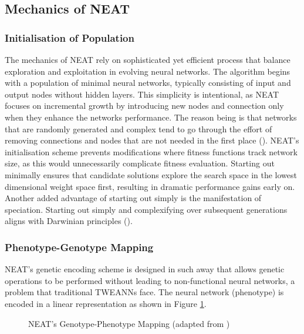 \subsection{Mechanics of NEAT}
\subsubsection{Initialisation of Population}
The mechanics of NEAT rely on sophisticated yet efficient process that balance exploration and exploitation in evolving neural networks. The algorithm begins with a population of minimal neural networks, typically consisting of input and output nodes without hidden layers. This simplicity is intentional, as NEAT focuses on incremental growth by introducing new nodes and connection only when they enhance the networks performance. The reason being is that networks that are randomly generated and complex tend to go through the effort of removing connections and nodes that are not needed in the first place (\cite{stanley2002evolving}). NEAT's initialisation scheme prevents modifications where fitness functions track network size, as this would unnecessarily complicate fitness evaluation. Starting out minimally ensures that candidate solutions explore the search space in the lowest dimensional weight space first, resulting in dramatic performance gains early on. Another added advantage of starting out simply is the manifestation of speciation. Starting out simply and complexifying over subsequent generations aligns with Darwinian principles (\cite{stanley2002evolving}).

\subsubsection{Phenotype-Genotype Mapping}
NEAT's genetic encoding scheme is designed in such away that allows genetic operations to be performed without leading to non-functional neural networks, a problem that traditional TWEANNs face. The neural network (phenotype) is encoded in a linear representation as shown in Figure \ref{fig:genotype_phenotype_neat_mapping}.

\parbreak
\begin{figure}[H] %
	\centering %
	\caption{NEAT's Genotype-Phenotype Mapping (adapted from \cite{stanley2002evolving})}
	\label{fig:genotype_phenotype_neat_mapping} %
\end{figure}

